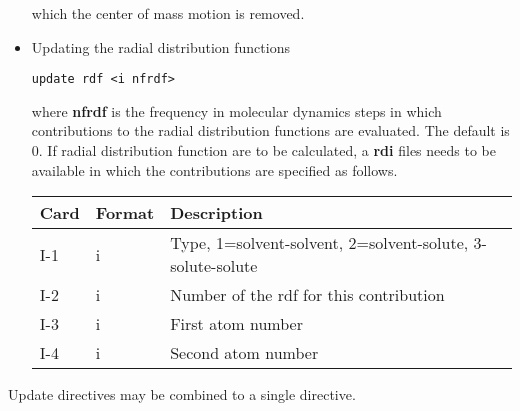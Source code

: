 \begin{itemize}
which the center of mass motion is removed.
\item
Updating the radial distribution functions
\begin{verbatim}
update rdf <i nfrdf>
\end{verbatim}
where {\bf nfrdf} is the frequency in molecular dynamics steps in 
which contributions to the radial distribution functions are
evaluated. The default is 0. If radial distribution function are to be
calculated, a {\bf rdi} files needs to be available in which the
contributions are specified as follows.
\begin{center}
\begin{tabular}{lll}
\hline\hline
Card & Format & Description \\ \hline
I-1  & i & Type, 1=solvent-solvent, 2=solvent-solute,
3-solute-solute\\
I-2  & i & Number of the rdf for this contribution\\
I-3  & i & First atom number \\
I-4  & i & Second atom number \\ 
\hline
\end{tabular}
\end{center}
\end{itemize}
Update directives may be combined to a single directive.
